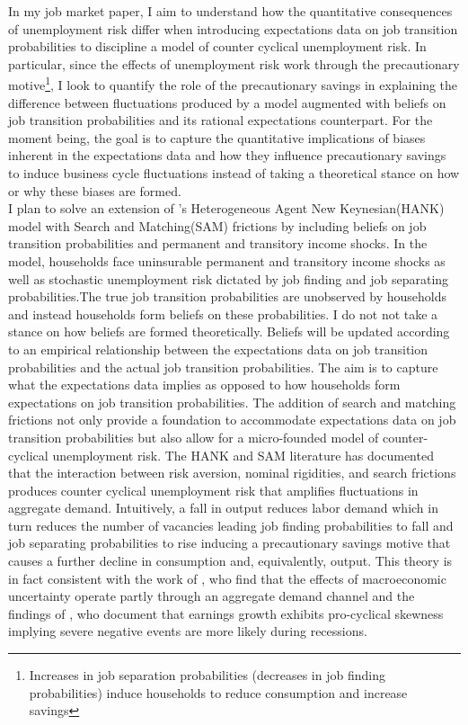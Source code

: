 \documentclass[titlepage]{\econtex}\providecommand{\texname}{Dissertation-Proposal}
\begin{document}
In my job market paper, I aim to understand how the quantitative consequences of unemployment risk differ when introducing expectations data on job transition probabilities to discipline a model of counter cyclical unemployment risk. In particular, since the effects of unemployment risk work through the precautionary motive\footnote{Increases in job separation probabilities (decreases in job finding probabilities) induce households to reduce consumption and increase savings}, I look to quantify the role of the precautionary savings in explaining the difference between fluctuations produced by a model augmented with beliefs on job transition probabilities and its rational expectations counterpart. For the moment being, the goal is to capture the quantitative implications of biases inherent in the expectations data and how they influence precautionary savings to induce business cycle fluctuations instead of taking a theoretical stance on how or why these biases are formed. \\

I plan to solve an extension of \cite{broer2021unemployment}'s Heterogeneous Agent New Keynesian(HANK) model with Search and Matching(SAM) frictions by including beliefs on job transition probabilities and permanent and transitory income shocks. In the model, households face uninsurable permanent and transitory income shocks as well as stochastic unemployment risk dictated by job finding and job separating probabilities.The true job transition probabilities are unobserved by households and instead households form beliefs on these probabilities. I do not not take a stance on how beliefs are formed theoretically. Beliefs will be updated according to an empirical relationship between the expectations data on job transition probabilities and the actual job transition probabilities. The aim is to capture what the expectations data implies as opposed to how households form expectations on job transition probabilities. The addition of search and matching frictions not only provide a foundation to accommodate expectations data on job transition probabilities but also allow for a micro-founded model of counter-cyclical unemployment risk. The HANK and SAM literature has documented that the interaction between risk aversion, nominal rigidities, and search frictions produces counter cyclical unemployment risk that amplifies fluctuations in aggregate demand. Intuitively, a fall in output reduces labor demand which in turn reduces the number of vacancies leading job finding probabilities to fall and job separating probabilities to rise inducing a precautionary savings motive that causes a further decline in consumption and, equivalently, output. This theory is in fact consistent with the work of \cite{leduc2016uncertainty}, who find that the effects of macroeconomic uncertainty operate partly through an aggregate demand channel and the findings of \cite{guvenen2014nature}, who document that earnings growth exhibits pro-cyclical skewness implying severe negative events are more likely during recessions. \\
\end{document}
